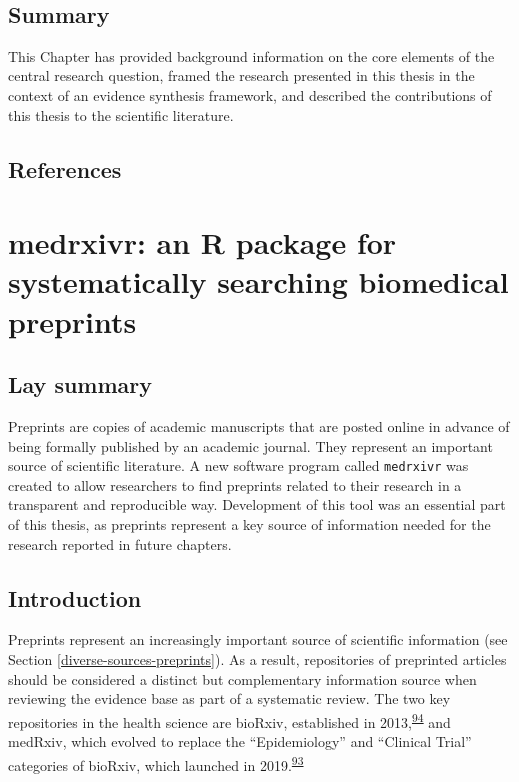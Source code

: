 \documentclass[a4paper, twoside]{templates/ociamthesis}
\begin{document}
~

\hypertarget{summary}{%
\section{Summary}\label{summary}}

This Chapter has provided background information on the core elements of the central research question, framed the research presented in this thesis in the context of an evidence synthesis framework, and described the contributions of this thesis to the scientific literature.

\newpage

\hypertarget{references}{%
\section{References}\label{references}}



\hypertarget{sys-rev-tools-heading}{%
\chapter{medrxivr: an R package for systematically searching biomedical preprints}\label{sys-rev-tools-heading}}

\minitoc 

\hypertarget{lay-summary-1}{%
\section{Lay summary}\label{lay-summary-1}}

Preprints are copies of academic manuscripts that are posted online in advance of being formally published by an academic journal. They represent an important source of scientific literature. A new software program called \texttt{medrxivr} was created to allow researchers to find preprints related to their research in a transparent and reproducible way. Development of this tool was an essential part of this thesis, as preprints represent a key source of information needed for the research reported in future chapters.

\hypertarget{sys-rev-tools-intro}{%
\section{Introduction}\label{sys-rev-tools-intro}}

Preprints represent an increasingly important source of scientific information (see Section \ref{diverse-sources-preprints}). As a result, repositories of preprinted articles should be considered a distinct but complementary information source when reviewing the evidence base as part of a systematic review. The two key repositories in the health science are bioRxiv, established in 2013,\textsuperscript{\protect\hyperlink{ref-sever2019}{94}} and medRxiv, which evolved to replace the ``Epidemiology'' and ``Clinical Trial'' categories of bioRxiv, which launched in 2019.\textsuperscript{\protect\hyperlink{ref-rawlinson2019}{93}}
\end{document}

